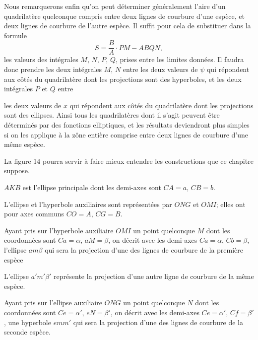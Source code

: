 \documentclass{article}
\begin{document}
Nous remarquerons enfin qu'on peut déterminer généralement l'aire d'un quadrilatère quelconque compris entre deux lignes de courbure d'une espèce, et deux lignes de courbure de l'autre espèce. Il suffit pour cela de substituer dans la formule
\[ S=\frac{B}{A}\cdot PM-ABQN, \]
les valeurs des intégrales $M$, $N$, $P$, $Q$, prises entre les limites données. Il faudra donc prendre les deux intégrales $M$, $N$ entre les deux valeurs de $\psi$ qui répondent aux côtés du quadrilatère dont les projections sont des hyperboles, et les deux intégrales $P$ et $Q$ entre

les deux valeurs de $x$ qui répondent aux côtés du quadrilatère dont les projections sont des ellipses. Ainsi tous les quadrilatères dont il s'agit peuvent être déterminés par des fonctions elliptiques, et les résultats deviendront plus simples si on les applique à la zône entière comprise entre deux lignes de courbure d'une même espèce.

La figure 14 pourra servir à faire mieux entendre les constructions que ce chapitre suppose.


$AKB$ est l'ellipse principale dont les demi-axes sont $CA=a$, $CB=b$.

L'ellipse et l'hyperbole auxiliaires sont représentées par $ONG$ et $OMI$; elles ont pour axes communs $CO=A$, $CG=B$.

Ayant pris sur l'hyperbole auxiliaire $OMI$ un point quelconque $M$ dont les coordonnées sont $Ca=\alpha$, $aM=\beta$, on décrit avec les demi-axes $Ca=\alpha$, $Cb=\beta$, l'ellipse $am\beta$ qui sera la projection d'une des lignes de courbure de la première espèce

L'ellipse $a'm'\beta'$ représente la projection d'une autre ligne de courbure de la même espèce.

Ayant pris sur l'ellipse auxiliaire $ONG$ un point quelconque $N$ dont les coordonnées sont $Ce=\alpha'$, $eN=\beta'$, on décrit avec les demi-axes $Ce=\alpha'$, $Cf=\beta'$, une hyperbole $emm'$ qui sera la projection d'une des lignes de courbure de la seconde espèce.
\end{document}

